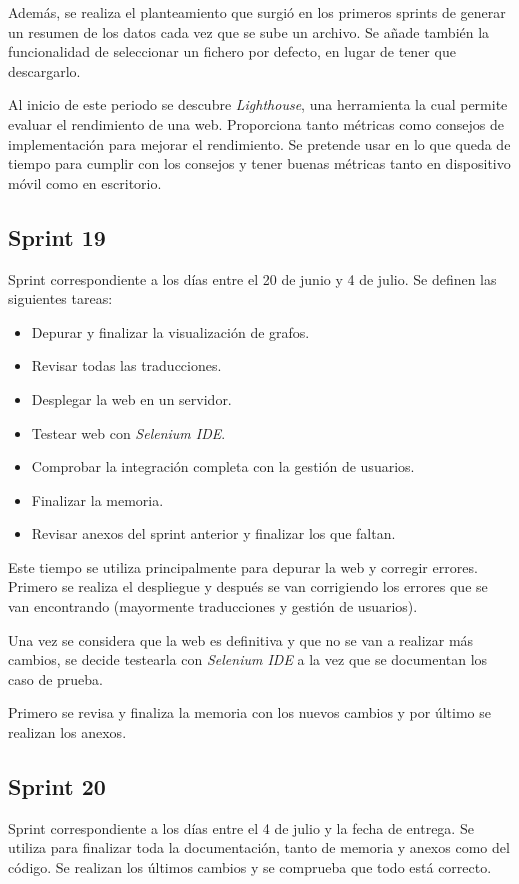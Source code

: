 Además, se realiza el planteamiento que surgió en los primeros sprints de generar un resumen de los datos cada vez que se sube un archivo. Se añade también la funcionalidad de seleccionar un fichero por defecto, en lugar de tener que descargarlo.

Al inicio de este periodo se descubre \textit{Lighthouse}, una herramienta la cual permite evaluar el rendimiento de una web. Proporciona tanto métricas como consejos de implementación para mejorar el rendimiento. Se pretende usar en lo que queda de tiempo para cumplir con los consejos y tener buenas métricas tanto en dispositivo móvil como en escritorio.

\subsection{Sprint 19}
Sprint correspondiente a los días entre el 20 de junio y 4 de julio. Se definen las siguientes tareas:
\begin{itemize}
	\item Depurar y finalizar la visualización de grafos.
	\item Revisar todas las traducciones.
	\item Desplegar la web en un servidor.
	\item Testear web con \textit{Selenium IDE}.
	\item Comprobar la integración completa con la gestión de usuarios.
	\item Finalizar la memoria.
	\item Revisar anexos del sprint anterior y finalizar los que faltan.
\end{itemize}

Este tiempo se utiliza principalmente para depurar la web y corregir errores. Primero se realiza el despliegue y después se van corrigiendo los errores que se van encontrando (mayormente traducciones y gestión de usuarios). 

Una vez se considera que la web es definitiva y que no se van a realizar más cambios, se decide testearla con \textit{Selenium IDE} a la vez que se documentan los caso de prueba.

Primero se revisa y finaliza la memoria con los nuevos cambios y por último se realizan los anexos.

\subsection{Sprint 20}
Sprint correspondiente a los días entre el 4 de julio y la fecha de entrega. Se utiliza para finalizar toda la documentación, tanto de memoria y anexos como del código. Se realizan los últimos cambios y se comprueba que todo está correcto.

